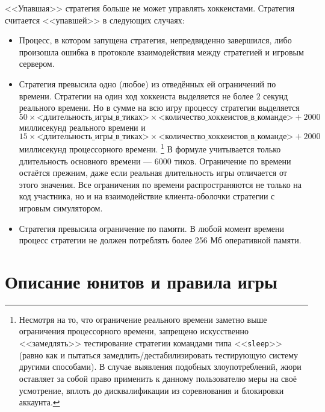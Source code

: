 <<Упавшая>> стратегия больше не может управлять хоккеистами. Стратегия считается <<упавшей>> в следующих случаях:
\begin{itemize}
  \item Процесс, в котором запущена стратегия, непредвиденно завершился, либо произошла ошибка в протоколе взаимодействия между стратегией
        и игровым сервером.
  \item Стратегия превысила одно (любое) из отведённых ей ограничений по времени. Стратегии на один ход хоккеиста выделяется не более
        $2$ секунд реального времени. Но в сумме на всю игру процессу стратегии выделяется
        \begin{equation}
        50\times\textit{<длительность\_игры\_в\_тиках>}\times\textit{<количество\_хоккеистов\_в\_команде>}+2000
        \end{equation}
        миллисекунд реального времени и
        \begin{equation}
        15\times\textit{<длительность\_игры\_в\_тиках>}\times\textit{<количество\_хоккеистов\_в\_команде>}+2000
        \end{equation}
        миллисекунд процессорного времени. \footnote[2]{Несмотря на то, что ограничение реального времени заметно выше ограничения
        процессорного времени, запрещено искусственно <<замедлять>> тестирование стратегии командами типа <<\texttt{sleep}>> (равно как и
        пытаться замедлить/дестабилизировать тестирующую систему другими способами). В случае выявления подобных злоупотреблений, жюри
        оставляет за собой право применить к данному пользователю меры на своё усмотрение, вплоть до дисквалификации из соревнования и
        блокировки аккаунта.} В формуле учитывается только длительность основного времени --- $6000$ тиков. Ограничение по времени остаётся
        прежним, даже если реальная длительность игры отличается от этого значения. Все ограничения по времени распространяются не только на
        код участника, но и на взаимодействие клиента-оболочки стратегии с игровым симулятором.
  \item Стратегия превысила ограничение по памяти. В любой момент времени процесс стратегии не должен потреблять более
        256 Мб оперативной памяти.
\end{itemize}

\section{Описание юнитов и правила игры}

